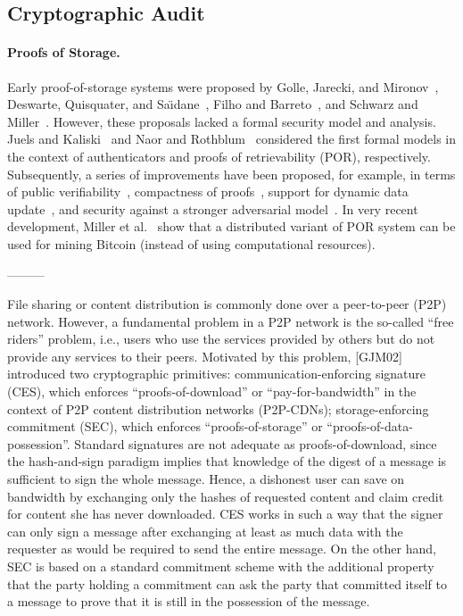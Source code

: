 \subsection{Cryptographic Audit}

\paragraph{Proofs of Storage.}
Early proof-of-storage systems were proposed by Golle, Jarecki, and Mironov~\cite{GJM02}, Deswarte, Quisquater, and Sa\"{\i}dane~\cite{DQS03}, Filho and Barreto~\cite{FB06}, and Schwarz and Miller~\cite{SM06}.
However, these proposals lacked a formal security model and analysis.
Juels and Kaliski~\cite{JK07} and Naor and Rothblum~\cite{NR09} considered the first formal models in the context of authenticators and proofs of retrievability (POR), respectively.
Subsequently, a series of improvements have been proposed, for example, in terms of public verifiability~\cite{AKK09,ABC+11}, compactness of proofs~\cite{SW13}, support for dynamic data update~\cite{SDJ+12,CKW13,SSP13}, and security against a stronger adversarial model~\cite{BJO09}.
In very recent development, Miller et al.~\cite{MJS+14} show that a distributed variant of POR system can be used for mining Bitcoin (instead of using computational resources).


---------

File sharing or content distribution is commonly done over a peer-to-peer (P2P) network. However, a fundamental problem in a P2P network is the so-called ``free riders'' problem, i.e., users who use the services provided by others but do not provide any services to their peers. Motivated by this problem, [GJM02] introduced two cryptographic primitives:
communication-enforcing signature (CES), which enforces ``proofs-of-download'' or ``pay-for-bandwidth'' in the context of P2P content distribution networks (P2P-CDNs);
storage-enforcing commitment (SEC), which enforces ``proofs-of-storage'' or ``proofs-of-data-possession''.
Standard signatures are not adequate as proofs-of-download, since the hash-and-sign paradigm implies that knowledge of the digest of a message is sufficient to sign the whole message. Hence, a dishonest user can save on bandwidth by exchanging only the hashes of requested content and claim credit for content she has never downloaded. CES works in such a way that the signer can only sign a message after exchanging at least as much data with the requester as would be required to send the entire message. On the other hand, SEC is based on a standard commitment scheme with the additional property that the party holding a commitment can ask the party that committed itself to a message to prove that it is still in the possession of the message.


